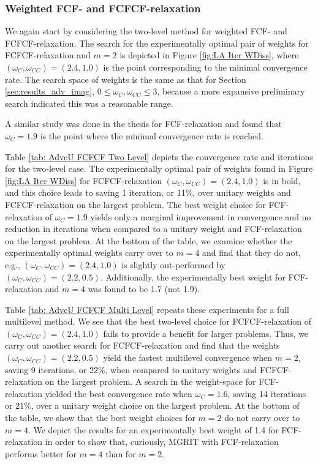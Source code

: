\documentclass[VANCOUVER,STIX1COL]{WileyNJD-v2}
\begin{document}
\subsubsection{Weighted FCF- and FCFCF-relaxation}
We again start by considering the two-level method for weighted FCF- and FCFCF-relaxation.  The search
for the experimentally optimal pair of weights for FCFCF-relaxation and $m=2$ is depicted in Figure 
\ref{fig:LA Iter WDiss}, where $(\omega_C, \omega_{CC}) = (2.4, 1.0)$ is the point corresponding to the minimal
convergence rate.  The search space of weights is the same as that for Section 
\ref{sec:results_adv_imag}, $0 \le \omega_C, \omega_{CC} \le 3$,  because 
a more expansive preliminary search indicated this was a reasonable range.

A similar study was done in the thesis \cite{Su2019_v2} for FCF-relaxation 
and found that $\omega_C = 1.9$ is the point where the minimal convergence rate is reached.

Table \ref{tab: AdvcU FCFCF Two Level} depicts the convergence rate and iterations for the two-level case.  The 
experimentally optimal pair of weights found in Figure \ref{fig:LA Iter WDiss} for FCFCF-relaxation $(\omega_C, \omega_{CC}) = (2.4, 1.0)$
is in bold, and this choice leads
to saving 1 iteration, or 11\%, over unitary weights and FCFCF-relaxation on the largest problem.  
The best weight choice for FCF-relaxation 
of $\omega_C = 1.9$ yields only a marginal improvement in convergence and no reduction in iterations when compared to a unitary 
weight and FCF-relaxation on the largest problem.  At the bottom of the table, we examine whether the experimentally optimal weights carry
over to $m=4$ and find that they do not, e.g., $(\omega_C, \omega_{CC}) = (2.4, 1.0)$ is slightly out-performed by
$(\omega_C, \omega_{CC}) = (2.2, 0.5)$.  Additionally, the experimentally best weight for FCF-relaxation and $m=4$ was found to
be 1.7 (not 1.9).   

Table \ref{tab: AdvcU FCFCF Multi Level} repeats these experiments for a full multilevel method.  We see that the 
best two-level choice for FCFCF-relaxation of $(\omega_C, \omega_{CC}) = (2.4, 1.0)$ fails to provide a benefit for larger problems.  Thus,
we carry out another search for FCFCF-relaxation and find that the weights $(\omega_C, \omega_{CC}) = (2.2, 0.5)$ yield the fastest multilevel
convergence when $m=2$, saving 9 iterations, or 22\%, when compared to unitary weights and FCFCF-relaxation on the 
largest problem.  A search in the weight-space for FCF-relaxation yielded the best convergence rate when 
$\omega_C = 1.6$, saving 14 iterations or 21\%, over a unitary weight choice on the largest problem.  At the bottom of the table, we show that the best weight choices for $m=2$ do not carry over
to $m=4$.  We depict the results for an experimentally best weight of 
1.4 for FCF-relaxation in order to show that, curiously, MGRIT with FCF-relaxation performs better for $m=4$ than for $m=2$.
\end{document}
